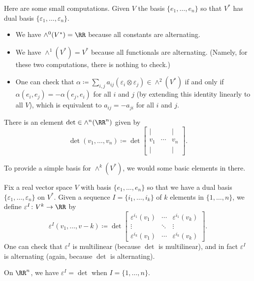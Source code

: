 \documentclass[../notes.tex]{subfiles}
\begin{document}
\begin{example}
	Here are some small computations. Given $V$ the basis $\{e_1,\ldots,e_n\}$ so that $V^*$ has dual basis $\{\varepsilon_1,\ldots,\varepsilon_n\}$.
	\begin{itemize}
		\item We have $\land^0(V^*)=\RR$ because all constants are alternating.
		\item We have $\land^1(V^*)=V^*$ because all functionals are alternating. (Namely, for these two computations, there is nothing to check.)
		\item One can check that $\alpha\coloneqq\sum_{i,j}a_{ij}(\varepsilon_i\otimes\varepsilon_j)\in\land^2(V^*)$ if and only if $\alpha(e_i,e_j)=-\alpha(e_j,e_i)$ for all $i$ and $j$ (by extending this identity linearly to all $V$), which is equivalent to $a_{ij}=-a_{ji}$ for all $i$ and $j$.
	\end{itemize}
\end{example}
\begin{example}
	There is an element $\det\in\land^n(\RR^n)$ given by
	\[\det(v_1,\ldots,v_n)\coloneqq\det\begin{bmatrix}
		| & & | \\
		v_1 & \cdots & v_n \\
		| && |
	\end{bmatrix}.\]
\end{example}
To provide a simple basis for $\land^k(V^*)$, we would some basic elements in there.
\begin{definition}
	Fix a real vector space $V$ with basis $\{e_1,\ldots,e_n\}$ so that we have a dual basis $\{\varepsilon_1,\ldots,\varepsilon_n\}$ on $V^*$. Given a sequence $I=\{i_1,\ldots,i_k\}$ of $k$ elements in $\{1,\ldots,n\}$, we define $\varepsilon^I\colon V^k\to\RR$ by
	\[\varepsilon^I(v_1,\ldots,v-k)\coloneqq\det\begin{bmatrix}
		\varepsilon^{i_1}(v_1) & \cdots & \varepsilon^{i_1}(v_k) \\
		\vdots & \ddots & \vdots \\
		\varepsilon^{i_k}(v_1) & \cdots & \varepsilon^{i_k}(v_k)
	\end{bmatrix}.\]
	One can check that $\varepsilon^I$ is multilinear (because $\det$ is multilinear), and in fact $\varepsilon^I$ is alternating (again, because $\det$ is alternating).
\end{definition}
\begin{example}
	On $\RR^n$, we have $\varepsilon^I=\det$ when $I=\{1,\ldots,n\}$.
\end{example}
\end{document}
